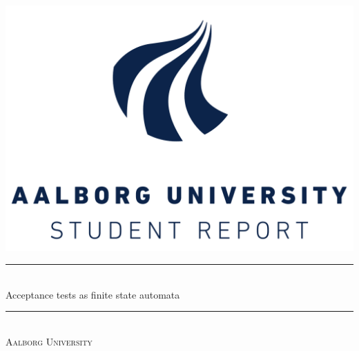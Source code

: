 \begin{titlingpage}

  \centering
  \includegraphics[scale=0.50]{images/aau_logo.pdf}\\[2 cm]
  \rule{\linewidth}{0.2 mm} \\[0.3 cm]
  {\LARGE Acceptance tests as finite state automata} \\[0.1 cm]
  \rule{\linewidth}{0.2 mm} \\[0.5 cm]
  \textsc{\large Aalborg University}\\[0.5 cm]
  {\Large \groupnumber}\\[0.5 cm]

\end{titlingpage}
